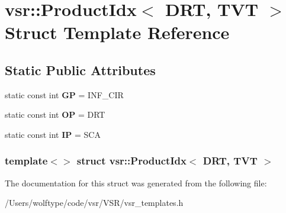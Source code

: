 \hypertarget{structvsr_1_1_product_idx_3_01_d_r_t_00_01_t_v_t_01_4}{\section{vsr\-:\-:Product\-Idx$<$ D\-R\-T, T\-V\-T $>$ Struct Template Reference}
\label{structvsr_1_1_product_idx_3_01_d_r_t_00_01_t_v_t_01_4}
}
\subsection*{Static Public Attributes}
\begin{DoxyCompactItemize}
\item 
\hypertarget{structvsr_1_1_product_idx_3_01_d_r_t_00_01_t_v_t_01_4_ace36c923fe8cee6ec8c1db7d9ed9f41f}{static const int {\bfseries G\-P} = I\-N\-F\-\_\-\-C\-I\-R}\label{structvsr_1_1_product_idx_3_01_d_r_t_00_01_t_v_t_01_4_ace36c923fe8cee6ec8c1db7d9ed9f41f}

\item 
\hypertarget{structvsr_1_1_product_idx_3_01_d_r_t_00_01_t_v_t_01_4_aed7f5c996ba89468717388ea60014f40}{static const int {\bfseries O\-P} = D\-R\-T}\label{structvsr_1_1_product_idx_3_01_d_r_t_00_01_t_v_t_01_4_aed7f5c996ba89468717388ea60014f40}

\item 
\hypertarget{structvsr_1_1_product_idx_3_01_d_r_t_00_01_t_v_t_01_4_af4435255250957e8d728156294afa010}{static const int {\bfseries I\-P} = S\-C\-A}\label{structvsr_1_1_product_idx_3_01_d_r_t_00_01_t_v_t_01_4_af4435255250957e8d728156294afa010}

\end{DoxyCompactItemize}
\subsubsection*{template$<$$>$ struct vsr\-::\-Product\-Idx$<$ D\-R\-T, T\-V\-T $>$}



The documentation for this struct was generated from the following file\-:\begin{DoxyCompactItemize}
\item 
/\-Users/wolftype/code/vsr/\-V\-S\-R/vsr\-\_\-templates.\-h\end{DoxyCompactItemize}
